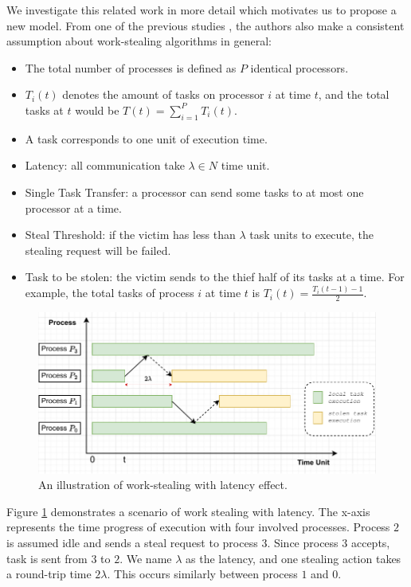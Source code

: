 We investigate this related work in more detail which motivates us to propose a new model. From one of the previous studies \cite{tchiboukdjian2013decentralized}, the authors also make a consistent assumption about work-stealing algorithms in general:
\begin{itemize}
	\item The total number of processes is defined as $P$ identical processors.
	\item $T_{i}(t)$ denotes the amount of tasks on processor $i$ at time $t$, and the total tasks at $t$ would be $T(t) = \sum_{i=1}^{P}T_{i}(t)$. 
	\item A task corresponds to one unit of execution time.
	\item Latency: all communication take $\lambda \in N$ time unit.
	\item Single Task Transfer: a processor can send some tasks to at most one processor at a time.
	\item Steal Threshold: if the victim has less than $\lambda$ task units to execute, the stealing request will be failed.
	\item Task to be stolen: the victim sends to the thief half of its tasks at a time. For example, the total tasks of process $i$ at time $t$ is $T_{i}(t) = \frac{T_{i}(t-1) - 1}{2}$.
\end{itemize}

\begin{figure}[t]
  \centering
  \includegraphics[scale=0.8]{./pictures/perf_analysis_model/perf_analysis_related_model_with_latency.pdf}
	\caption{An illustration of work-stealing with latency effect.}
	\label{fig:perfmodel_relatedmodelwithlatency}
\end{figure}

Figure \ref{fig:perfmodel_relatedmodelwithlatency} demonstrates a scenario of work stealing with latency. The x-axis represents the time progress of execution with four involved processes. Process $2$ is assumed idle and sends a steal request to process $3$. Since process $3$ accepts, task is sent from $3$ to $2$. We name $\lambda$ as the latency, and one stealing action takes a round-trip time $2\lambda$. This occurs similarly between process $1$ and $0$.\\

